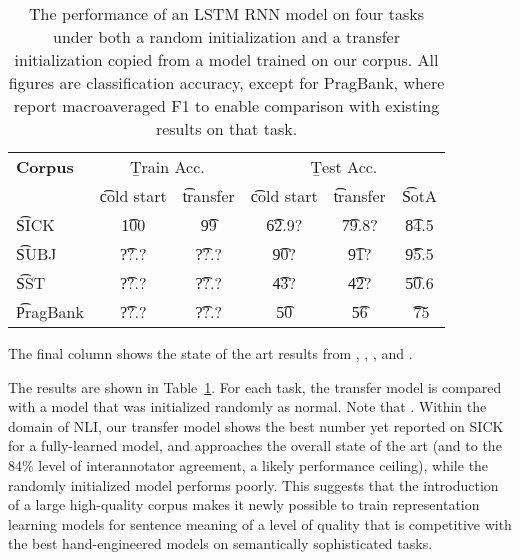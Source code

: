 \noindent{}


\begin{table}
\begin{center}
\begin{tabular}{l@{\hskip \colspaceL}c@{\hskip \colspaceS}c@{\hskip \colspaceS}c@{\hskip \colspaceS}c@{\hskip \colspaceS}c}
\hline
\textbf{Corpus} & \multicolumn{2}{c}{\b{Train Acc.}} &\multicolumn{3}{c}{ \b{Test Acc.}} \\
 & \t{cold start} & \t{transfer} & \t{cold start} & \t{transfer} & \t{SotA} \\
\hline
\t{SICK}            & \t{100} & \t{99} & \t{62.9?} & \t{79.8?} & \t{84.5} \\
\t{SUBJ}          & \t{??.?} & \t{??.?} & \t{90?} & \t{91?}& \t{95.5} \\
\t{SST}          & \t{??.?} & \t{??.?} & \t{43?} & \t{42?} & \t{50.6}\\
\t{PragBank}          & \t{??.?} & \t{??.?} & \t{50} & \t{56}& \t{~75} \\
\hline
\end{tabular}
\end{center}

\caption{\label{tab:transferresults}
The performance of an LSTM RNN model on four tasks under both a random initialization and a transfer initialization copied from a model trained on our corpus. All figures are classification accuracy, except for PragBank, where report macroaveraged F1 to enable comparison with existing results on that task. } 

\end{table}

The final column shows the state of the art results from \citealt{lai2014illinois}, \citealt{zhao2015self}, \citealt{tai2015improved}, and .

The results are shown in Table~\ref{tab:transferresults}. For each task, the transfer model is compared with a model that was initialized randomly as normal. Note that . Within the domain of NLI, our transfer model shows the best number yet reported on SICK for a fully-learned model, and approaches the overall state of the art (and to the 84\% level of interannotator agreement, a likely performance ceiling), while the randomly initialized model performs poorly. This suggests that the introduction of a large high-quality corpus makes it newly possible to train representation learning models for sentence meaning of a level of quality that is competitive with the best hand-engineered models on semantically sophisticated tasks.

\noindent{}